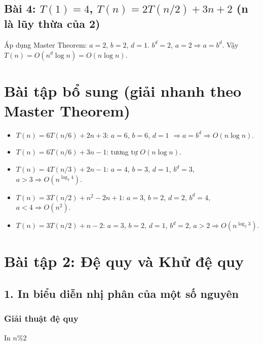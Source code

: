 \documentclass{article}
\begin{document}
\subsection*{Bài 4: $T(1) = 4$, $T(n) = 2T(n/2) + 3n + 2$ (n là lũy thừa của 2)}
Áp dụng Master Theorem: $a=2$, $b=2$, $d=1$.
$b^d = 2$, $a=2 \Rightarrow a = b^d$.
Vậy $T(n) = O(n^d \log n) = O(n \log n)$.

\section*{Bài tập bổ sung (giải nhanh theo Master Theorem)}

\begin{itemize}
    \item $T(n) = 6T(n/6) + 2n + 3$: $a=6$, $b=6$, $d=1$ $\Rightarrow a=b^d \Rightarrow O(n\log n)$.
    \item $T(n) = 6T(n/6) + 3n - 1$: tương tự $O(n\log n)$.
    \item $T(n) = 4T(n/3) + 2n - 1$: $a=4$, $b=3$, $d=1$, $b^d=3$, $a>3 \Rightarrow O(n^{\log_3 4})$.
    \item $T(n) = 3T(n/2) + n^2 - 2n + 1$: $a=3$, $b=2$, $d=2$, $b^d=4$, $a<4 \Rightarrow O(n^2)$.
    \item $T(n) = 3T(n/2) + n - 2$: $a=3$, $b=2$, $d=1$, $b^d=2$, $a>2 \Rightarrow O(n^{\log_2 3})$.
\end{itemize}


\section*{Bài tập 2: Đệ quy và Khử đệ quy}

\subsection*{1. In biểu diễn nhị phân của một số nguyên}

\subsubsection*{Giải thuật đệ quy}
\begin{algorithm}[H]
\caption{In nhị phân đệ quy}
\begin{algorithmic}
        \STATE {}
    \ENDIF
    \STATE In $n \% 2$
\ENDPROCEDURE
\end{algorithmic}
\end{algorithm}
\end{document}
